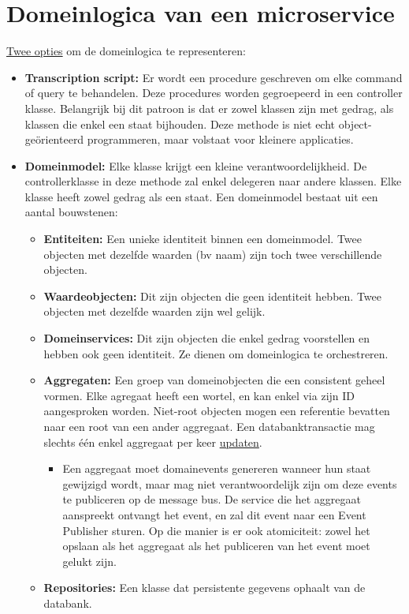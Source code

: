 	\chapter{Domeinlogica van een microservice}
	\underline{Twee opties} om de domeinlogica te representeren:
	\begin{itemize}
		\item \textbf{Transcription script:} Er wordt een procedure geschreven om elke command of query te behandelen. Deze procedures worden gegroepeerd in een controller klasse. Belangrijk bij dit patroon is dat er zowel klassen zijn met gedrag, als klassen die enkel een staat bijhouden. Deze methode is niet echt object-geörienteerd programmeren, maar volstaat voor kleinere applicaties.
		\item \textbf{Domeinmodel:} Elke klasse krijgt een kleine verantwoordelijkheid. De controllerklasse in deze methode zal enkel delegeren naar andere klassen. Elke klasse heeft zowel gedrag als een staat. Een domeinmodel bestaat uit een aantal bouwstenen:
		\begin{itemize}
			\item \textbf{Entiteiten:} Een unieke identiteit binnen een domeinmodel. Twee objecten met dezelfde waarden (bv naam) zijn toch twee verschillende objecten.
			\item \textbf{Waardeobjecten:} Dit zijn objecten die geen identiteit hebben. Twee objecten met dezelfde waarden zijn wel gelijk.  
			\item \textbf{Domeinservices:} Dit zijn objecten die enkel gedrag voorstellen en hebben ook geen identiteit. Ze dienen om domeinlogica te orchestreren.
		\item \textbf{Aggregaten:} Een groep van domeinobjecten die een consistent geheel vormen. Elke agregaat heeft een wortel, en kan enkel via zijn ID aangesproken worden. Niet-root objecten mogen een referentie bevatten naar een root van een ander aggregaat. Een databanktransactie mag slechts één enkel aggregaat per keer \underline{updaten}. 
			\begin{itemize}
				\item Een aggregaat moet domainevents genereren wanneer hun staat gewijzigd wordt, maar mag niet verantwoordelijk zijn om deze events te publiceren op de message bus. De service die het aggregaat aanspreekt ontvangt het event, en zal dit event naar een Event Publisher sturen. Op die manier is er ook atomiciteit: zowel het opslaan als het aggregaat als het publiceren van het event moet gelukt zijn.
			\end{itemize}
			\item \textbf{Repositories:} Een klasse dat persistente gegevens ophaalt van de databank.
		\end{itemize}
	\end{itemize}

